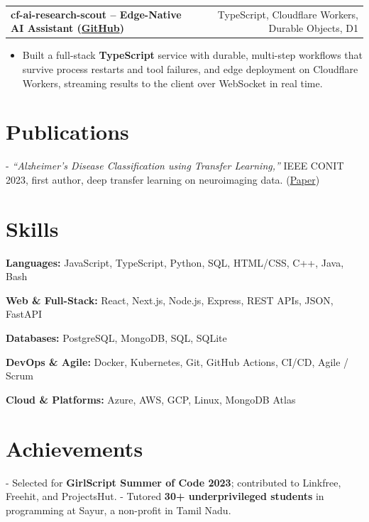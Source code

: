 \documentclass[letterpaper,11pt]{article}
\makeatletter
\newcommand{\projItem}[2]{%
  \vspace{6pt}
  \begin{tabular*}{\textwidth}{@{}l@{\extracolsep{\fill}}r@{}}
    \textbf{#1} & #2 \\
  \end{tabular*}\par\vspace{-2pt}
}
\newcommand{\skillLine}[2]{\textbf{#1:} #2\par\vspace{2pt}}
\newcommand{\inlineBlock}[1]{{\setlength{\leftskip}{0.18in}\small #1\par}}
\makeatother
\begin{document}
\projItem{cf-ai-research-scout -- Edge-Native AI Assistant {\normalfont\small(\href{https://github.com/Deva-1903/cf_ai_research_scout}{GitHub})}}{TypeScript, Cloudflare Workers, Durable Objects, D1}
\begin{itemize}
  \item Built a full-stack \textbf{TypeScript} service with durable, multi-step workflows that survive process restarts and tool failures, and edge deployment on Cloudflare Workers, streaming results to the client over WebSocket in real time.
\end{itemize}

\section{Publications}
\inlineBlock{- \textit{``Alzheimer's Disease Classification using Transfer Learning,''} IEEE CONIT 2023, first author, deep transfer learning on neuroimaging data. {\normalfont\small(\href{https://ieeexplore.ieee.org/document/10205760}{Paper})}}

\section{Skills}
\skillLine{Languages}{JavaScript, TypeScript, Python, SQL, HTML/CSS, C++, Java, Bash}
\skillLine{Web \& Full-Stack}{React, Next.js, Node.js, Express, REST APIs, JSON, FastAPI}
\skillLine{Databases}{PostgreSQL, MongoDB, SQL, SQLite}
\skillLine{DevOps \& Agile}{Docker, Kubernetes, Git, GitHub Actions, CI/CD, Agile / Scrum}
\skillLine{Cloud \& Platforms}{Azure, AWS, GCP, Linux, MongoDB Atlas}

\section{Achievements}
\inlineBlock{- Selected for \textbf{GirlScript Summer of Code 2023}; contributed to Linkfree, Freehit, and ProjectsHut. - Tutored \textbf{30+ underprivileged students} in programming at Sayur, a non-profit in Tamil Nadu.}
\end{document}
